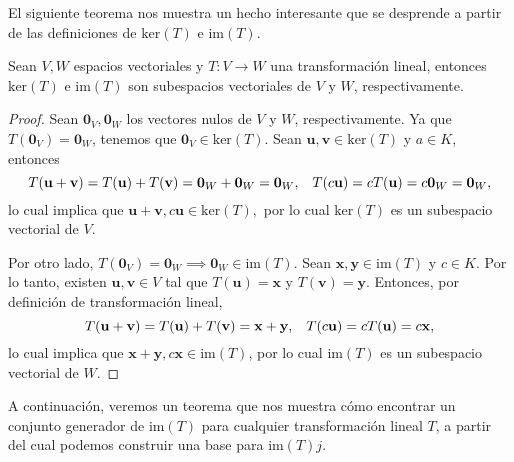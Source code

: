 \documentclass[12pt]{article}
\newenvironment{teorema}[2][Teorema]{\begin{trivlist}
\item[\hskip \labelsep {\bfseries #1}\hskip \labelsep {\bfseries #2.}]}{\end{trivlist}}
\begin{document}
El siguiente teorema nos muestra un hecho interesante que se desprende a partir de las definiciones de $\text{ker}(T)$ e $\text{im}(T)$.

\begin{teorema} {5.2.1}
    Sean $V,W$ espacios vectoriales y $T:V\to W$ una transformación lineal, entonces $\text{ker}(T)$ e $\text{im}(T)$ son subespacios vectoriales de $V$ y $W$, respectivamente.
   \begin{proof}
       Sean $\mathbf{0}_V, \mathbf{0}_W$ los vectores nulos de $V$ y $W$, respectivamente. Ya que $T(\mathbf{0}_V)=\mathbf{0}_W$, tenemos que $\mathbf{0}_V\in \text{ker}(T).$ Sean $\mathbf{u}, \mathbf{v} \in \text{ker}(T)$ y $a\in K$, entonces $$T(\mathbf{u}+\mathbf{v})=T(\mathbf{u})+T(\mathbf{v})=\mathbf{0}_W+\mathbf{0}_W=\mathbf{0}_W,\hspace{3mm} T(c\mathbf{u})=cT(\mathbf{u})=c\mathbf{0}_W=\mathbf{0}_W,$$ \noindent lo cual implica que $\mathbf{u}+\mathbf{v},c\mathbf{u}\in \text{ker}(T),$ por lo cual $\text{ker}(T)$ es un subespacio vectorial de $V$.

       Por otro lado, $T(\mathbf{0}_V)=\mathbf{0}_W\implies \mathbf{0}_W\in \text{im}(T).$ Sean $\mathbf{x}, \mathbf{y}\in \text{im}(T)$ y $c\in K$. Por lo tanto, existen $\mathbf{u}, \mathbf{v}\in V$ tal que $T(\mathbf{u})=\mathbf{x}$ y $T(\mathbf{v})=\mathbf{y}.$ Entonces, por definición de transformación lineal, $$T(\mathbf{u}+\mathbf{v})=T(\mathbf{u})+T(\mathbf{v})=\mathbf{x}+\mathbf{y}, \hspace{3mm} T(c\mathbf{u})=cT(\mathbf{u})=c\mathbf{x},$$ lo cual implica que $\mathbf{x}+\mathbf{y}, c\mathbf{x}\in \text{im}(T)$, por lo cual $\text{im}(T)$ es un subespacio vectorial de $W$.

   \end{proof}
\end{teorema}

A continuación, veremos un teorema que nos muestra cómo encontrar un conjunto generador de $\text{im}(T)$ para cualquier transformación lineal $T$, a partir del cual podemos construir una base para $\text{im}(T)j$.
\end{document}
